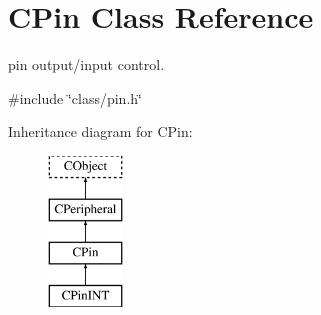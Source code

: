 \hypertarget{class_c_pin}{\section{C\-Pin Class Reference}
\label{class_c_pin}
}


pin output/input control.  




{\ttfamily \#include \char`\"{}class/pin.\-h\char`\"{}}

Inheritance diagram for C\-Pin\-:\begin{figure}[H]
\begin{center}
\leavevmode
\includegraphics[height=4.000000cm]{class_c_pin}
\end{center}
\end{figure}
